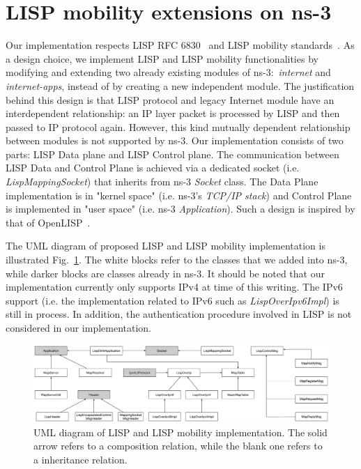  
\section{ LISP mobility extensions on ns-3}
\label{sec:ns3_lispmn}
Our implementation respects LISP RFC 6830~\cite{rfc6830} and LISP mobility standards~\cite{meyer2016lisp}. As a design choice, we implement LISP and LISP mobility functionalities by modifying and extending two already existing modules of ns-3:~\emph{internet} and \emph{internet-apps}, instead of by creating a new independent module. The justification behind this design is that LISP protocol and legacy Internet module have an interdependent relationship: an IP layer packet is processed by LISP and then passed to IP protocol again. However, this kind mutually dependent relationship between modules is not supported by ns-3. Our implementation consists of two parts: LISP Data plane and LISP Control plane. The communication between LISP Data and Control Plane is achieved via a dedicated socket (i.e. \emph{LispMappingSocket}) that inherits from ns-3 \emph{Socket} class. The Data Plane implementation is in "kernel space" (i.e. ns-3's \emph{TCP/IP stack}) and Control Plane is implemented in "user space" (i.e. ns-3 \emph{Application}). Such a design is inspired by that of OpenLISP~\cite{saucez2009openlisp}.  

The UML diagram of proposed LISP and LISP mobility implementation is illustrated Fig.~\ref{LISP_UML}. The white blocks refer to the classes that we added into ns-3, while darker blocks are classes already in ns-3. It should be noted that our implementation currently only supports IPv4 at time of this writing. The IPv6 support (i.e. the implementation related to IPv6 such as \emph{LispOverIpv6Impl}) is still in process. In addition, the authentication procedure involved in LISP is not considered in our implementation.%
\begin{figure}[!t]
	\centering
	\includegraphics[width=\textwidth]{Pics/LISP_NS3_UML}
	\caption{UML diagram of LISP and LISP mobility implementation. The solid arrow refers to a composition relation, while the blank one refers to a inheritance relation.}
	\label{LISP_UML}
\end{figure}
